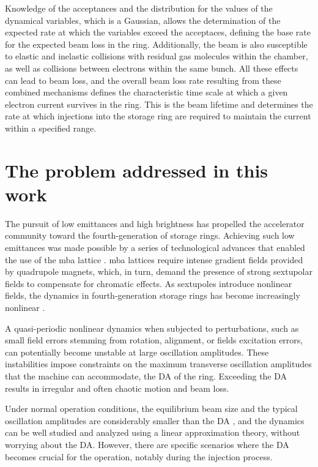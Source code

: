 Knowledge of the acceptances and the distribution for the values of the dynamical variables, which is a Gaussian, allows the determination of the expected rate at which the variables exceed the acceptaces, defining the base rate for the expected beam loss in the ring. Additionally, the beam is also susceptible to elastic and inelastic collisions with residual gas molecules within the chamber, as well as collisions between electrons within the same bunch. All these effects can lead to beam loss, and the overall beam loss rate resulting from these combined mechanisms defines the characteristic time scale at which a given electron current survives in the ring. This is the beam lifetime and determines the rate at which injections into the storage ring are required to maintain the current within a specified range.

\section*{The problem addressed in this work}

The pursuit of low emittances and high brightness has propelled the accelerator community toward the fourth-generation of storage rings. Achieving such low emittances was made possible by a series of technological advances that enabled the use of the \gls*{mba} lattice \cite{liu_towards_2017,hettel_challenges_2014}. \gls*{mba} lattices require intense gradient fields provided by quadrupole magnets, which, in turn, demand the presence of strong sextupolar fields to compensate for chromatic effects. As sextupoles introduce nonlinear fields, the dynamics in fourth-generation storage rings has become increasingly nonlinear \cite{liu_towards_2017}.

A quasi-periodic nonlinear dynamics when subjected to perturbations, such as small field errors stemming from rotation, alignment, or fields excitation errors, can potentially become unstable at large oscillation amplitudes. These instabilities impose constraints on the maximum transverse oscillation amplitudes that the machine can accommodate, the \gls*{DA} of the ring. Exceeding the \gls*{DA} results in irregular and often chaotic motion and beam loss.

Under normal operation conditions, the equilibrium beam size and the typical oscillation amplitudes are considerably smaller than the \gls*{DA} , and the dynamics can be well studied and analyzed using a linear approximation theory, without worrying about the \gls*{DA}. However, there are specific scenarios where the \gls*{DA} becomes crucial for the operation, notably during the injection process.

